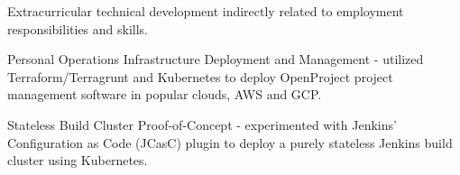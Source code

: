 
Extracurricular technical development indirectly related to employment responsibilities and skills.

\begin{zitemize}
    \item Personal Operations Infrastructure Deployment and Management - utilized Terraform/Terragrunt and Kubernetes to deploy OpenProject project management software in popular clouds, AWS and GCP.
    \item Stateless Build Cluster Proof-of-Concept - experimented with Jenkins’ Configuration as Code (JCasC) plugin to deploy a purely stateless Jenkins build cluster using Kubernetes.
\end{zitemize}
